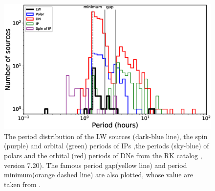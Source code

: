 \documentclass[fleqn,usenatbib]{mnras}
\begin{document}
\begin{figure}
\centering
\includegraphics[scale=0.73]{./figure/CV/N_P.eps}
\caption{The period distribution of the LW sources (dark-blue line), the spin (purple) and orbital (green) periods of IPs ,the periods (sky-blue) of polars and the orbital (red) periods of DNe from the RK catalog \citep{2003A&A...404..301R}, version 7.20). The famous period gap(yellow line) and period minimum(orange dashed line) are also plotted, whose value are taken from \citep{2011ApJS..194...28K}.\label{fig:N_P}}
\end{figure}
\end{document}
